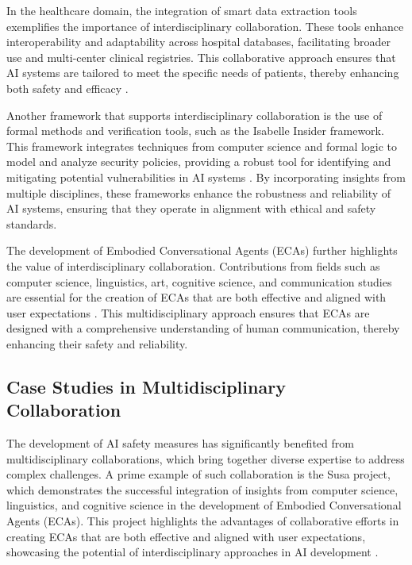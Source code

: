 In the healthcare domain, the integration of smart data extraction tools exemplifies the importance of interdisciplinary collaboration. These tools enhance interoperability and adaptability across hospital databases, facilitating broader use and multi-center clinical registries. This collaborative approach ensures that AI systems are tailored to meet the specific needs of patients, thereby enhancing both safety and efficacy \cite{quennelle2023smartdataextractorclinician}.

Another framework that supports interdisciplinary collaboration is the use of formal methods and verification tools, such as the Isabelle Insider framework. This framework integrates techniques from computer science and formal logic to model and analyze security policies, providing a robust tool for identifying and mitigating potential vulnerabilities in AI systems \cite{kammller2020applyingisabelleinsiderframework}. By incorporating insights from multiple disciplines, these frameworks enhance the robustness and reliability of AI systems, ensuring that they operate in alignment with ethical and safety standards.

The development of Embodied Conversational Agents (ECAs) further highlights the value of interdisciplinary collaboration. Contributions from fields such as computer science, linguistics, art, cognitive science, and communication studies are essential for the creation of ECAs that are both effective and aligned with user expectations \cite{korre2023takesvillagemultidisciplinaritycollaboration}. This multidisciplinary approach ensures that ECAs are designed with a comprehensive understanding of human communication, thereby enhancing their safety and reliability.


\subsection{Case Studies in Multidisciplinary Collaboration} \label{subsec:Case Studies in Multidisciplinary Collaboration}

The development of AI safety measures has significantly benefited from multidisciplinary collaborations, which bring together diverse expertise to address complex challenges. A prime example of such collaboration is the Susa project, which demonstrates the successful integration of insights from computer science, linguistics, and cognitive science in the development of Embodied Conversational Agents (ECAs). This project highlights the advantages of collaborative efforts in creating ECAs that are both effective and aligned with user expectations, showcasing the potential of interdisciplinary approaches in AI development \cite{korre2023takesvillagemultidisciplinaritycollaboration}.



